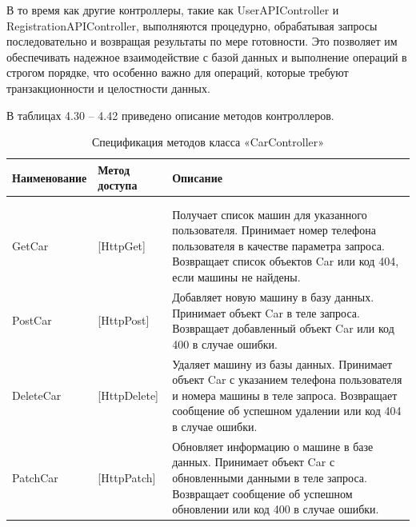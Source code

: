 В то время как другие контроллеры, такие как UserAPIController и RegistrationAPIController, выполняются процедурно, обрабатывая запросы последовательно и возвращая результаты по мере готовности. Это позволяет им обеспечивать надежное взаимодействие с базой данных и выполнение операций в строгом порядке, что особенно важно для операций, которые требуют транзакционности и целостности данных.

В таблицах 4.30 -- 4.42 приведено описание методов контроллеров.

\renewcommand{\arraystretch}{0.8} %
\begin{xltabular}{\textwidth}{|p{4cm}|p{3cm}|>{\setlength{\baselineskip}{0.7\baselineskip}}X|}
	\caption{Спецификация методов класса «CarController» \label{class43:table}}\\
	\hline \centrow \setlength{\baselineskip}{0.7\baselineskip} Наименование & \centrow \setlength{\baselineskip}{0.7\baselineskip} Метод доступа & \centrow Описание \\
	\hline {} &  & \\ \hline
	\endfirsthead
	 &  & \\ 
	\hline
	\finishhead
	GetCar & [HttpGet] & Получает список машин для указанного пользователя. Принимает номер телефона пользователя в качестве параметра запроса. Возвращает список объектов Car или код 404, если машины не найдены. \\ \hline 
	PostCar & [HttpPost] & Добавляет новую машину в базу данных. Принимает объект Car в теле запроса. Возвращает добавленный объект Car или код 400 в случае ошибки. \\ \hline 
	DeleteCar & [HttpDelete] & Удаляет машину из базы данных. Принимает объект Car с указанием телефона пользователя и номера машины в теле запроса. Возвращает сообщение об успешном удалении или код 404 в случае ошибки. \\ \hline 
	PatchCar & [HttpPatch] & Обновляет информацию о машине в базе данных. Принимает объект Car с обновленными данными в теле запроса. Возвращает сообщение об успешном обновлении или код 400 в случае ошибки. \\ \hline 
\end{xltabular}
\renewcommand{\arraystretch}{1.0} %

